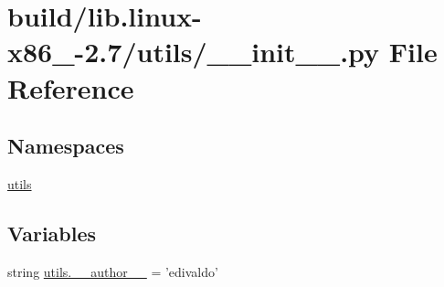 \hypertarget{build_2lib_8linux-x86__64-2_87_2utils_2____init_____8py}{}\section{build/lib.linux-\/x86\+\_-\/2.7/utils/\+\_\+\+\_\+init\+\_\+\+\_\+.py File Reference}
\label{build_2lib_8linux-x86__64-2_87_2utils_2____init_____8py}
\subsection*{Namespaces}
\begin{DoxyCompactItemize}
\item 
 \hyperlink{namespaceutils}{utils}
\end{DoxyCompactItemize}
\subsection*{Variables}
\begin{DoxyCompactItemize}
\item 
string \hyperlink{namespaceutils_aeb6687368997f6715177ec772a5b2353}{utils.\+\_\+\+\_\+author\+\_\+\+\_\+} = 'edivaldo'
\end{DoxyCompactItemize}

